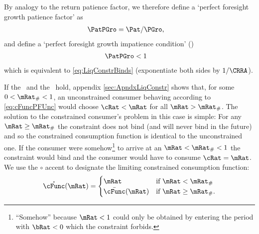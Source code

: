 \documentclass[./BufferStockTheory.tex]{subfiles}
\begin{document}
\hypertarget{PFGIC}{}
By analogy to the return patience factor, we therefore define a `perfect
foresight growth patience factor' as
\begin{equation}\begin{gathered}\begin{aligned}
  \PatPGro  & = {\Pat}/\PGro,  \label{eq:PFGPF}
\end{aligned}\end{gathered}\end{equation}
and define a `perfect foresight growth impatience condition' (\PFGIC)
\begin{equation}\begin{gathered}\begin{aligned}
  \label{eq:PFGIC}
  \PatPGro &  < 1
\end{aligned}\end{gathered}\end{equation}
which is equivalent to \eqref{eq:LiqConstrBinds} (exponentiate both
sides by $1/\CRRA$).

If the \RIC~and the \FHWC~hold, appendix \ref{sec:ApndxLiqConstr} shows
that, for some $0 < \mRat_{\#} < 1$, an unconstrained consumer behaving according to
\eqref{eq:cFuncPFUnc} would choose $\cRat < \mRat$ for all $\mRat >
\mRat_{\#}$.  The solution to the
constrained consumer's problem in this case is simple: For any $\mRat
\geq \mRat_{\#}$ the constraint does not bind (and will never bind in
the future) and so the constrained consumption function is identical
to the unconstrained one.  If the consumer were somehow\footnote{``Somehow'' because $\mRat<1$ could only be
obtained by entering the period with $\bRat < 0$ which the constraint
forbids.}
to arrive at an $\mRat < \mRat_{\#} < 1$ the constraint would bind and
the consumer would have to consume $\cRat=\mRat$.  We use the $\circ$ accent to designate the limiting
constrained consumption function:
\begin{equation}
\mathring{\cFunc}(\mRat)=
\begin{cases}
 \mRat & \text{if $\mRat < \mRat_{\#}$} \\
 \bar{\cFunc}(\mRat)  & \text{if $\mRat \geq \mRat_{\#}$.}
\end{cases}
\end{equation}
\end{document}

